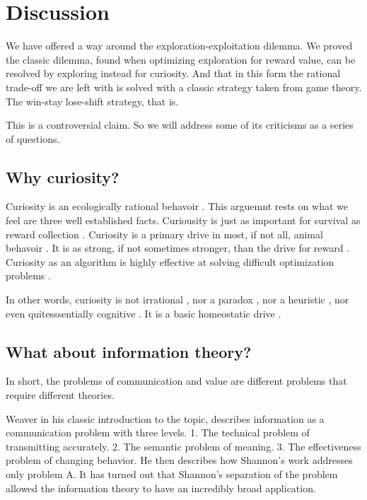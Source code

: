 \section{Discussion}
We have offered a way around the exploration-exploitation dilemma. We proved the classic dilemma, found when optimizing exploration for reward value, can be resolved by exploring instead for curiosity. And that in this form the rational trade-off we are left with is solved with a classic strategy taken from game theory. The win-stay lose-shift strategy, that is.

This is a controversial claim. So we will address some of its criticisms as a series of questions.

\subsection*{Why curiosity?}
Curiosity is an ecologically rational behavoir \cite{Rich2016a}. This arguemnt rests on what we feel are three well established facts. Curiousity is just as important for survival as reward collection \cite{Thrun1992}. Curiosity is a primary drive in most, if not all, animal behavoir \cite{Inglis2001}. It is as strong, if not sometimes stronger, than the drive for reward \cite{Loewenstein1994,Kidd2015,Gottlieb2018}. Curiosity as an algorithm is highly effective at solving difficult optimization problems \cite{Schmidhuber1991,Pathak2017,Stanton2018,Lehman201,Mouret2011b1,Fister2019,Mouret2015,Colas2020,Cully2015,Pathak2017,Schwartenbeck2019.Laversanne-Finot2018}. 

In other words, curiosity is not irrational \cite{}, nor a paradox \cite{}, nor a heuristic \cite{}, nor even quitesssentially cognitive \cite{Berlyne1950}. It is a basic homeostatic drive \cite{Loewenstein1994}. 


\subsection*{What about information theory?}
In short, the problems of communication and value are different problems that require different theories.

Weaver \citep{Shannon1948} in his classic introduction to the topic, describes information as a communication problem with three levels. 1. The technical problem of transmitting accurately. 2. The semantic problem of meaning. 3. The effectiveness problem of changing behavior. He then describes how Shannon's work addresses only problem A. It has turned out that Shannon's separation of the problem allowed the information theory to have an incredibly broad application. 

